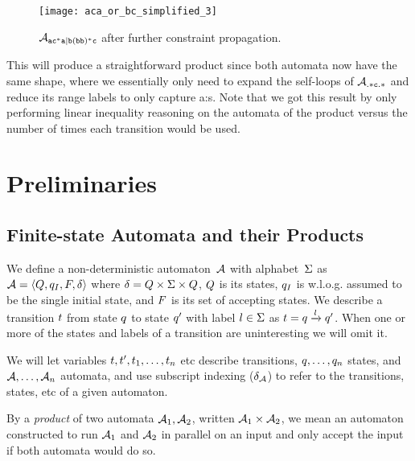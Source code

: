 \documentclass[acmsmall,review,anonymous]{acmart}\settopmatter{printfolios=true,printccs=false,printacmref=true}
\theoremstyle{definition}
\begin{document}
  \begin{figure}[h]
    \begin{minipage}[b]{0.75\linewidth}
    \centering 
      \texttt{[image: aca\_or\_bc\_simplified\_3]}
      \caption{$\mathcal{A}_{\mathtt{ac^*a|b(bb)^*c}}{}$ after further constraint propagation.}\label{fig:example-simplify-3}
    \end{minipage}
    \end{figure}

This will produce a straightforward product since both automata now have the
same shape, where we essentially only need to expand the self-loops of
$\mathcal{A}_{\mathtt{.*c.*}}$ and reduce its range labels to only capture a:s. Note
that we got this result by only performing linear inequality reasoning on the
automata of the product versus the number of times each transition would be
used.

\section{Preliminaries}

\subsection{Finite-state Automata and their Products}
We define a non-deterministic automaton~$\mathcal{A}$ with alphabet~$\Sigma$
as $\mathcal{A} = \left\langle Q, q_I, F, \delta\right\rangle$ where $\delta = Q \times \Sigma
\times Q$, $Q$ is its states, $q_I$ is w.l.o.g. assumed to
be the single initial state, and $F$ is its set of accepting
states.  We describe a transition $t$ from state $q$ to state
$q'$ with label $l \in \Sigma$ as $t =
q \xrightarrow{l} q'$. When one or more of the states and
labels of a transition are uninteresting we will omit it.

We will let variables $t, t', t_1, \ldots, t_n$ etc describe transitions, $q, \ldots, q_n$ states, and $\mathcal{A}, \ldots, \mathcal{A}_n$ automata, and use subscript indexing ($\delta_{\mathcal{A}}$) to refer to the transitions, states, etc of a given automaton.

By a \emph{product} of two automata $\mathcal{A}_1, \mathcal{A}_2$, written
$\mathcal{A}_1 \times \mathcal{A}_2$, we mean an automaton constructed to run
$\mathcal{A}_1$ and $\mathcal{A}_2$ in parallel on an input and only accept the
input if both automata would do so.
\end{document}

